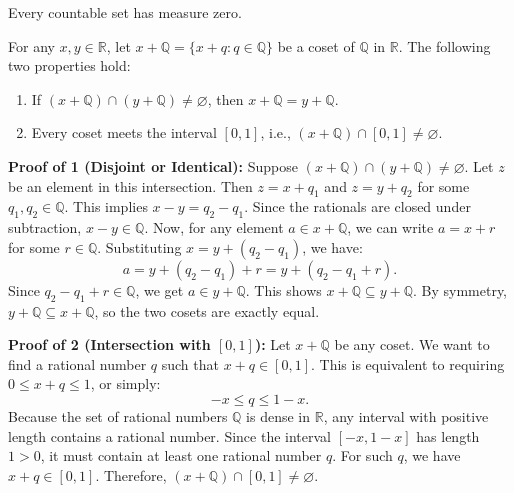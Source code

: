 \begin{remark}
    Every countable set has measure zero.
\end{remark}


\begin{lemma}
    For any $x, y \in \mathbb{R}$, let $x+\mathbb{Q} = \{x+q : q \in \mathbb{Q}\}$ be a coset of $\mathbb{Q}$ in $\mathbb{R}$. The following two properties hold:
    \begin{enumerate}
        \item If $(x+\mathbb{Q}) \cap (y+\mathbb{Q}) \neq \varnothing$, then $x+\mathbb{Q} = y+\mathbb{Q}$.
        \item Every coset meets the interval $[0,1]$, i.e., $(x+\mathbb{Q}) \cap [0,1] \neq \varnothing$.
    \end{enumerate}
\end{lemma}

\begin{pfbox}
    \textbf{Proof of 1 (Disjoint or Identical):}
    Suppose $(x+\mathbb{Q}) \cap (y+\mathbb{Q}) \neq \varnothing$. Let $z$ be an element in this intersection. 
    Then $z = x+q_1$ and $z = y+q_2$ for some $q_1, q_2 \in \mathbb{Q}$. 
    This implies $x - y = q_2 - q_1$. Since the rationals are closed under subtraction, $x - y \in \mathbb{Q}$.
    Now, for any element $a \in x+\mathbb{Q}$, we can write $a = x+r$ for some $r \in \mathbb{Q}$. 
    Substituting $x = y + (q_2 - q_1)$, we have:
    $$ a = y + (q_2 - q_1) + r = y + (q_2 - q_1 + r). $$
    Since $q_2 - q_1 + r \in \mathbb{Q}$, we get $a \in y+\mathbb{Q}$. This shows $x+\mathbb{Q} \subseteq y+\mathbb{Q}$. 
    By symmetry, $y+\mathbb{Q} \subseteq x+\mathbb{Q}$, so the two cosets are exactly equal.

    \textbf{Proof of 2 (Intersection with $[0,1]$):}
    Let $x+\mathbb{Q}$ be any coset. We want to find a rational number $q$ such that $x+q \in [0,1]$.
    This is equivalent to requiring $0 \le x+q \le 1$, or simply:
    $$ -x \le q \le 1-x. $$
    Because the set of rational numbers $\mathbb{Q}$ is dense in $\mathbb{R}$, any interval with positive length contains a rational number. 
    Since the interval $[-x, 1-x]$ has length $1 > 0$, it must contain at least one rational number $q$. 
    For such $q$, we have $x+q \in [0,1]$. Therefore, $(x+\mathbb{Q}) \cap [0,1] \neq \varnothing$.
\end{pfbox}

